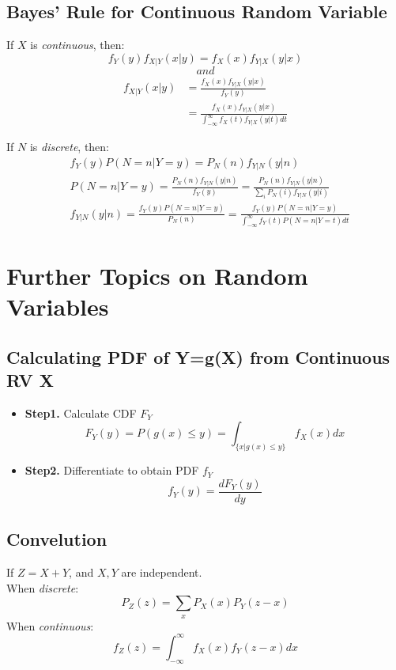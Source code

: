 \documentclass[11pt]{article}
\begin{document}
\subsection{Bayes' Rule for Continuous Random Variable}
If $X$ is \emph{continuous}, then:\\
$$f_Y(y)f_{X|Y}(x|y) = f_X(x)f_{Y|X}(y|x)$$
$$and$$
\begin{equation*}
    \begin{split}
        f_{X|Y}(x|y) & = \frac{f_X(x)f_{Y|X}(y|x)}{f_Y(y)}\\
        & = \frac{f_X(x)f_{Y|X}(y|x)}{\int_{-\infty}^{\infty} f_X(t)f_{Y|X}(y|t)dt}
    \end{split}
\end{equation*}

If $N$ is \emph{discrete}, then: \\
\begin{equation*}
    \begin{split}
        & f_Y(y)P(N=n | Y=y) = P_N(n)f_{Y|N}(y|n)\\
        & P(N=n | Y=y) = \frac{P_N(n)f_{Y|N}(y|n)}{f_Y(y)} = \frac{P_N(n)f_{Y|N}(y|n)}{\sum_i P_N(i)f_{Y|N}(y|i)}\\
        & f_{Y|N}(y|n) = \frac{f_Y(y)P(N=n|Y=y)}{P_N(n)} = \frac{f_Y(y)P(N=n|Y=y)}{\int_{-\infty}^{\infty} f_Y(t) P(N=n|Y=t)dt}
    \end{split}
\end{equation*}

\section{Further Topics on Random Variables}
\subsection{Calculating PDF of Y=g(X) from Continuous RV X}
\begin{itemize}
    \item \textbf{Step1. }Calculate CDF $F_Y$
    $$F_Y(y) = P(g(x)\leq y) = \int_{\{x|g(x)\leq y\}} f_X(x)dx$$
    \item \textbf{Step2. }Differentiate to obtain PDF $f_Y$
    $$f_Y(y) = \frac{dF_Y(y)}{dy}$$
\end{itemize}

\subsection{Convelution}
If $Z=X+Y$, and $X , Y$ are independent.\\
When \emph{discrete}:\\
$$P_Z(z) = \sum_x P_X(x)P_Y(z-x)$$
When \emph{continuous}:\\
$$f_Z(z) = \int_{-\infty}^{\infty} f_X(x)f_Y(z-x)dx$$
\end{document}

